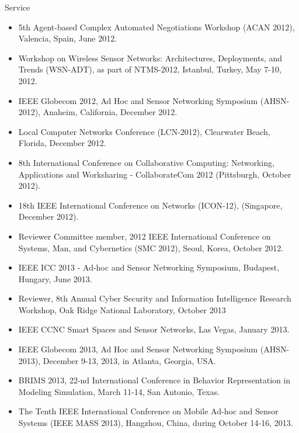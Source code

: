 \begin{category}{Service}
\begin{itemize}
\item 5th Agent-based Complex Automated Negotiations Workshop (ACAN 2012), Valencia, Spain, June 2012.

\item Workshop on Wireless Sensor Networks: Architectures, Deployments, and Trends (WSN-ADT), as part of NTMS-2012, Istanbul, Turkey, May 7-10, 2012.

\item IEEE Globecom 2012, Ad Hoc and Sensor Networking Symposium (AHSN-2012), Anaheim, California, December 2012.

\item Local Computer Networks Conference (LCN-2012), Clearwater Beach, Florida, December 2012.

\item 8th International Conference on Collaborative Computing: Networking, Applications and Worksharing - CollaborateCom 2012 (Pittsburgh, October 2012).

\item 18th IEEE International Conference on Networks (ICON-12), (Singapore, December 2012).

\item Reviewer Committee member, 2012 IEEE International Conference on Systems, Man, and Cybernetics (SMC 2012), Seoul, Korea, October 2012.

\item IEEE ICC 2013 - Ad-hoc and Sensor Networking Symposium, Budapest, Hungary, June 2013.

\item Reviewer, 8th Annual Cyber Security and Information Intelligence Research Workshop, Oak Ridge National Laboratory, October 2013

\item IEEE CCNC Smart Spaces and Sensor Networks, Las Vegas, January 2013.

\item IEEE Globecom 2013, Ad Hoc and Sensor Networking Symposium (AHSN-2013), December 9-13, 2013, in Atlanta, Georgia, USA.

\item BRIMS 2013, 22-nd International Conference in Behavior Representation in Modeling Simulation, March 11-14, San Antonio, Texas.

\item The Tenth IEEE International Conference on Mobile Ad-hoc and Sensor Systems (IEEE MASS 2013), Hangzhou, China, during October 14-16, 2013.


\end{itemize}
\end{category}
